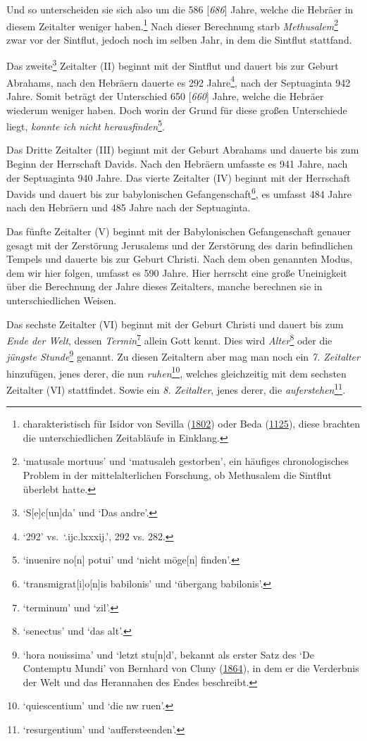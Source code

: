 \documentclass[
]{article}
\begin{document}
Und so unterscheiden sie sich also um die 586 {[}\emph{686}{]} Jahre,
welche die Hebräer in diesem Zeitalter weniger haben.\footnote{charakteristisch
  für Isidor von Sevilla
  (\href{https://books.google.com/books?id=wb8Z_vlSyJwC}{1802}) oder
  Beda
  (\href{http://archivesetmanuscrits.bnf.fr/ark:/12148/cc76825p}{1125}),
  diese brachten die unterschiedlichen Zeitabläufe in Einklang.} Nach
dieser Berechnung starb \emph{Methusalem}\footnote{`matusale mortuus'
  und `matusaleh gestorben', ein häufiges chronologisches Problem in der
  mittelalterlichen Forschung, ob Methusalem die Sintflut überlebt
  hatte.} zwar vor der Sintflut, jedoch noch im selben Jahr, in dem die
Sintflut stattfand.

Das zweite\footnote{`S{[}e{]}c{[}un{]}da' und `Das andre'.} Zeitalter
(II) beginnt mit der Sintflut und dauert bis zur Geburt Abrahams, nach
den Hebräern dauerte es 292 Jahre\footnote{`292' vs.~`.ijc.lxxxij.', 292
  vs. 282.}, nach der Septuaginta 942 Jahre. Somit beträgt der
Unterschied 650 {[}\emph{660}{]} Jahre, welche die Hebräer wiederum
weniger haben. Doch worin der Grund für diese großen Unterschiede liegt,
\emph{konnte ich nicht herausfinden}\footnote{`inuenire no{[}n{]} potui'
  und `nicht möge{[}n{]} finden'.}.

Das Dritte Zeitalter (III) beginnt mit der Geburt Abrahams und dauerte
bis zum Beginn der Herrschaft Davids. Nach den Hebräern umfasste es 941
Jahre, nach der Septuaginta 940 Jahre. Das vierte Zeitalter (IV) beginnt
mit der Herrschaft Davids und dauert bis zur babylonischen
Gefangenschaft\footnote{`transmigrat{[}i{]}o{[}n{]}is babilonis' und
  `übergang babilonis'.}, es umfasst 484 Jahre nach den Hebräern und 485
Jahre nach der Septuaginta.

Das fünfte Zeitalter (V) beginnt mit der Babylonischen Gefangenschaft
genauer gesagt mit der Zerstörung Jerusalems und der Zerstörung des
darin befindlichen Tempels und dauerte bis zur Geburt Christi. Nach dem
oben genannten Modus, dem wir hier folgen, umfasst es 590 Jahre. Hier
herrscht eine große Uneinigkeit über die Berechnung der Jahre dieses
Zeitalters, manche berechnen sie in unterschiedlichen Weisen.

Das sechste Zeitalter (VI) beginnt mit der Geburt Christi und dauert bis
zum \emph{Ende der Welt}, dessen \emph{Termin}\footnote{`terminum' und
  `zil'.} allein Gott kennt. Dies wird \emph{Alter}\footnote{`senectus'
  und `das alt'.} oder die \emph{jüngste Stunde}\footnote{`hora
  nouissima' und `letzt stu{[}n{]}d', bekannt als erster Satz des `De
  Contemptu Mundi' von Bernhard von Cluny
  (\href{https://books.google.com/books?id=pAM_lfiF7EUC}{1864}), in dem
  er die Verderbnis der Welt und das Herannahen des Endes beschreibt.}
genannt. Zu diesen Zeitaltern aber mag man noch ein \emph{7. Zeitalter}
hinzufügen, jenes derer, die nun \emph{ruhen}\footnote{`quiescentium'
  und `die nw ruen'.}, welches gleichzeitig mit dem sechsten Zeitalter
(VI) stattfindet. Sowie ein \emph{8. Zeitalter}, jenes derer, die
\emph{auferstehen}\footnote{`resurgentium' und `auffersteenden'.}.
\end{document}
